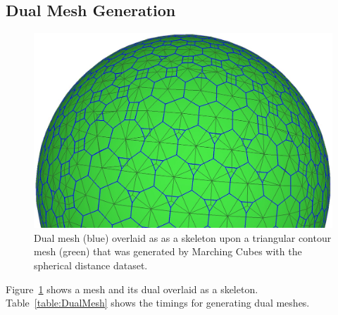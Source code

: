 \documentclass[10pt,journal,cspaper,compsoc]{IEEEtran}
\begin{document}
\subsection{Dual Mesh Generation}

\begin{figure}[htb]
\begin{center}
\includegraphics[width=\linewidth]{DualMeshSkeleton.jpg}
\end{center}
\caption{Dual mesh (blue) overlaid as as a skeleton upon a triangular contour mesh (green) that was generated by Marching Cubes with the spherical distance dataset.}
\label{fig:DualMeshSkeleton}
\end{figure}

Figure~\ref{fig:DualMeshSkeleton} shows a mesh and its dual overlaid as a skeleton. Table~\ref{table:DualMesh} shows the timings for generating dual meshes.

\end{document}
